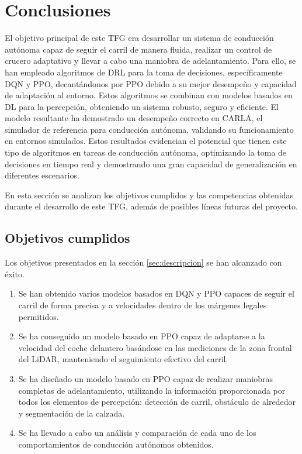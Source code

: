 \chapter{Conclusiones}
\label{cap:capitulo5}

El objetivo principal de este \ac{TFG} era desarrollar un sistema de conducción autónoma capaz de seguir el carril de manera fluida, realizar un control de crucero adaptativo y llevar a cabo una maniobra de adelantamiento. Para ello, se han empleado algoritmos de \ac{DRL} para la toma de decisiones, específicamente \ac{DQN} y \ac{PPO}, decantándonos por PPO debido a su mejor desempeño y capacidad de adaptación al entorno. Estos algoritmos se combinan con modelos basados en \ac{DL} para la percepción, obteniendo un sistema robusto, seguro y eficiente. El modelo resultante ha demostrado un desempeño correcto en CARLA, el simulador de referencia para conducción autónoma, validando su funcionamiento en entornos simulados. Estos resultados evidencian el potencial que tienen este tipo de algoritmos en tareas de conducción autónoma, optimizando la toma de decisiones en tiempo real y demostrando una gran capacidad de generalización en diferentes escenarios.

En esta sección se analizan los objetivos cumplidos y las competencias obtenidas durante el desarrollo de este \ac{TFG}, además de posibles líneas futuras del proyecto.

\section{Objetivos cumplidos}

Los objetivos presentados en la sección \ref{sec:descripcion} se han alcanzado con éxito.

\begin{enumerate}
\item Se han obtenido varios modelos basados en \ac{DQN} y \ac{PPO} capaces de seguir el carril de forma precisa y a velocidades dentro de los márgenes legales permitidos. 
\item Se ha conseguido un modelo basado en \ac{PPO} capaz de adaptarse a la velocidad del coche delantero basándose en las mediciones de la zona frontal del \ac{LiDAR}, manteniendo el seguimiento efectivo del carril.
\item Se ha diseñado un modelo basado en \ac{PPO} capaz de realizar maniobras completas de adelantamiento, utilizando la información proporcionada por todos los elementos de percepción: detección de carril, obstáculo de alrededor y segmentación de la calzada.
\item Se ha llevado a cabo un análisis y comparación de cada uno de los comportamientos de conducción autónomos obtenidos.
\end{enumerate}

